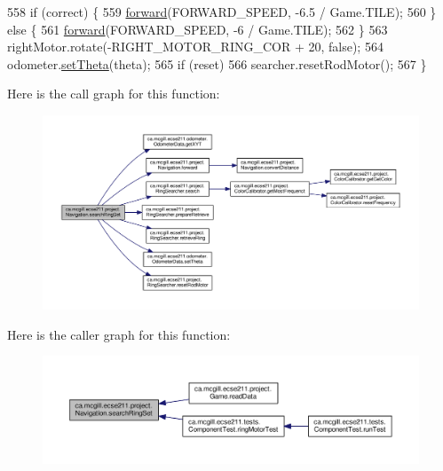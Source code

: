 \begin{DoxyCode}
558     \textcolor{keywordflow}{if} (correct) \{
559       \hyperlink{classca_1_1mcgill_1_1ecse211_1_1project_1_1_navigation_a7c66610c5b7496ddb35d342ab2cd3f08}{forward}(FORWARD\_SPEED, -6.5 / Game.TILE);
560     \} \textcolor{keywordflow}{else} \{
561       \hyperlink{classca_1_1mcgill_1_1ecse211_1_1project_1_1_navigation_a7c66610c5b7496ddb35d342ab2cd3f08}{forward}(FORWARD\_SPEED, -6 / Game.TILE);
562     \}
563     rightMotor.rotate(-RIGHT\_MOTOR\_RING\_COR + 20, \textcolor{keyword}{false});
564     odometer.\hyperlink{classca_1_1mcgill_1_1ecse211_1_1odometer_1_1_odometer_data_a419b8f07c2c5374411c8e62298e9a402}{setTheta}(theta);
565     \textcolor{keywordflow}{if} (reset)
566       searcher.resetRodMotor();
567   \}
\end{DoxyCode}
Here is the call graph for this function\+:\nopagebreak
\begin{figure}[H]
\begin{center}
\leavevmode
\includegraphics[width=350pt]{classca_1_1mcgill_1_1ecse211_1_1project_1_1_navigation_a1a808e665b8dd5b8e79b0580724d239c_cgraph}
\end{center}
\end{figure}
Here is the caller graph for this function\+:\nopagebreak
\begin{figure}[H]
\begin{center}
\leavevmode
\includegraphics[width=350pt]{classca_1_1mcgill_1_1ecse211_1_1project_1_1_navigation_a1a808e665b8dd5b8e79b0580724d239c_icgraph}
\end{center}
\end{figure}
\mbox{\label{classca_1_1mcgill_1_1ecse211_1_1project_1_1_navigation_ae8530d181ffd790ff9dea5eeab54b1a1}} 
